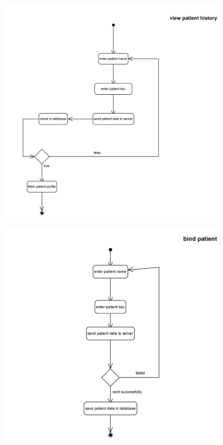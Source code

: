 \documentclass[]{article}
\begin{document}
\begin{figure}[H]
\centering
\includegraphics[scale=0.6]{./activity/20}
\end{figure}
\begin{figure}[H]
\centering
\includegraphics[scale=0.6]{./activity/21}
\end{figure}
\end{document}
